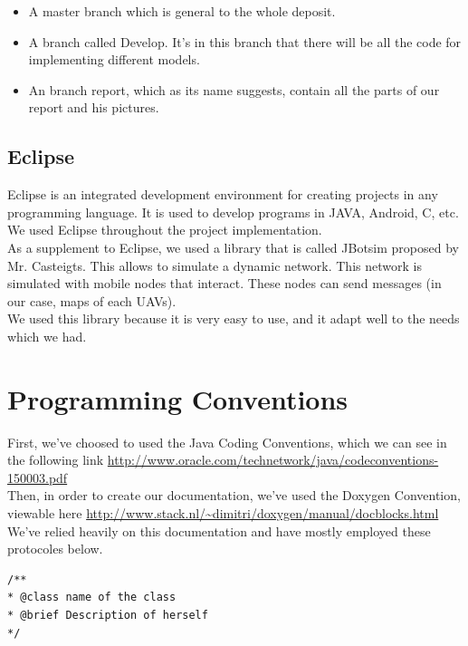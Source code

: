 \begin{itemize}
\item A master branch which is general to the whole deposit.
\item A branch called Develop. It's in this branch that there will be all the code for implementing different models.
\item An branch report, which as its name suggests, contain all the parts of our report and his pictures.
\end{itemize}

\subsection{Eclipse}

Eclipse is an integrated development environment for creating projects in any programming language. It is used to develop programs in JAVA, Android, C, etc.\\

We used Eclipse throughout the project implementation.\\

As a supplement to Eclipse, we used a library that is called JBotsim \cite{JBotSim} proposed by Mr. Casteigts. This allows to simulate a dynamic network. This network is simulated with mobile nodes that interact. These nodes can send messages (in our case, maps of each UAVs).\\

We used this library because it is very easy to use, and it adapt well to the needs which we had.

\section{Programming Conventions}

First, we've choosed to used the Java Coding Conventions, which we can see in the following link \url{http://www.oracle.com/technetwork/java/codeconventions-150003.pdf}\\

Then, in order to create our documentation, we've used the Doxygen Convention, viewable here \url{http://www.stack.nl/~dimitri/doxygen/manual/docblocks.html}\\
We've relied heavily on this documentation and have mostly employed these protocoles below.\\

\begin{lstlisting}[frame=trBL, title=Doxygen Convention for classes]
/**
* @class name of the class
* @brief Description of herself
*/
\end{lstlisting}

